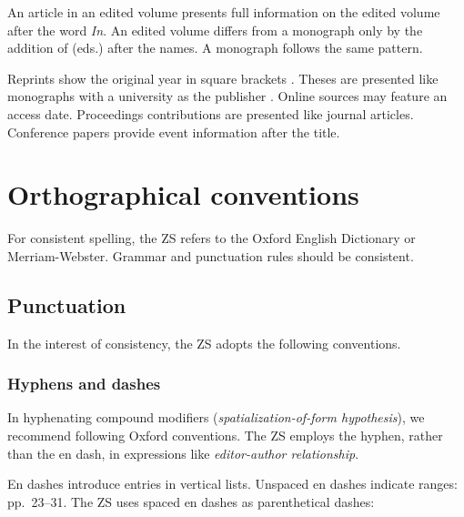 \documentclass{zsarticle}
\begin{document}
An article in an edited volume \parencite{cristofaro2017} presents full information on the edited volume after the word \emph{In}. An edited volume \parencite{cangemietal2018} differs from a monograph only by the addition of (eds.) after the names. A monograph \parencite{vangelderen2022} follows the same pattern.

Reprints show the original year in square brackets \parencite{weinhold1883}. Theses are presented like monographs with a university as the publisher \parencite{sahlgren2006}. Online sources \parencite{native2025,r2021} may feature an access date. Proceedings contributions \parencite{crainetal1986} are presented like journal articles. Conference papers \parencite{faller2019} provide event information after the title.

\section{Orthographical conventions}\label{sec:ortho}

For consistent spelling, the ZS refers to the Oxford English Dictionary or Merriam-Webster. Grammar and punctuation rules should be consistent.

\subsection{Punctuation}\label{sec:punctuation}

In the interest of consistency, the ZS adopts the following conventions.

\subsubsection{Hyphens and dashes}\label{sec:dashes}

In hyphenating compound modifiers (\emph{spatialization-of-form hypothesis}), we recommend following Oxford conventions. The ZS employs the hyphen, rather than the en dash, in expressions like \emph{editor-author relationship}.

En dashes introduce entries in vertical lists. Unspaced en dashes indicate ranges: pp.~23--31. The ZS uses spaced en dashes as parenthetical dashes:
\end{document}
